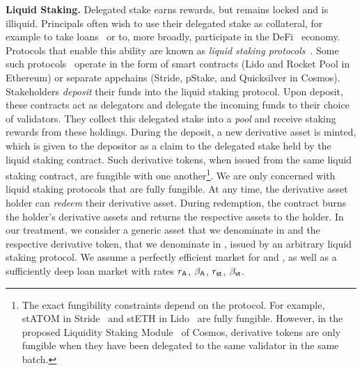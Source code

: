 \noindent
\textbf{Liquid Staking.} Delegated stake earns rewards, but remains locked and
is illiquid. Principals often wish to use their delegated stake as collateral,
for example to take loans~\cite{gudgeon2020defi} or to, more broadly, participate in the
DeFi~\cite{defi-sok} economy. Protocols that enable this ability are known as
\emph{liquid staking protocols}~\cite{liquid-staking-report}.
Some such protocols~\cite{lido,stride} operate
in the form of smart contracts (\eg Lido and Rocket Pool in Ethereum) or separate appchains
(\eg Stride, pStake, and Quicksilver in Cosmos).
Stakeholders \emph{deposit} their funds into the liquid staking protocol.
Upon deposit, these contracts act as
delegators and delegate the incoming funds to their choice of validators.
They collect this delegated stake into a \emph{pool} and receive staking
rewards from these holdings.
During the deposit, a new derivative asset is minted,
which is given to the depositor as a claim to the delegated stake held by the
liquid staking contract. Such derivative tokens, when issued from the same liquid
staking contract, are fungible with one another\footnote{The exact fungibility
constraints depend on the protocol. For example,
\textsf{stATOM} in Stride~\cite{stride} and \textsf{stETH} in Lido~\cite{lido} are fully fungible.
However, in the proposed Liquidity Staking
Module~\cite{liquidity-staking-module} of Cosmos,
derivative tokens are only fungible when they have been
delegated to the same validator in the same batch.}. We are only concerned with liquid
staking protocols that are fully fungible. At any time, the derivative asset holder
can \emph{redeem} their derivative asset.
During redemption, the contract burns
the holder's derivative assets and returns the respective assets to the holder.
In our treatment, we consider a generic asset that we denominate in \asset
and the respective derivative token, that we denominate in \stasset,
issued by an arbitrary liquid staking protocol.
We assume a perfectly efficient market for \asset and \stasset,
as well as a sufficiently deep loan market with rates
$r_{\textsf{A}}$, $\beta_{\textsf{A}}$, $r_{\textsf{st}}$, $\beta_{\textsf{st}}$.


